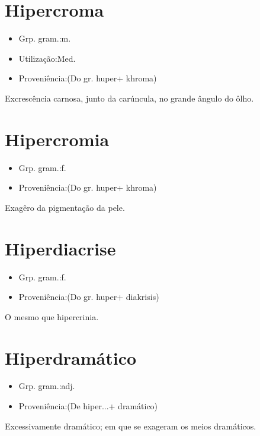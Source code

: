 \documentclass{article}
\begin{document}
\section{Hipercroma}
\begin{itemize}
\item {Grp. gram.:m.}
\end{itemize}
\begin{itemize}
\item {Utilização:Med.}
\end{itemize}
\begin{itemize}
\item {Proveniência:(Do gr. \textunderscore huper\textunderscore  + \textunderscore khroma\textunderscore )}
\end{itemize}
Excrescência carnosa, junto da carúncula, no grande ângulo do ôlho.
\section{Hipercromia}
\begin{itemize}
\item {Grp. gram.:f.}
\end{itemize}
\begin{itemize}
\item {Proveniência:(Do gr. \textunderscore huper\textunderscore  + \textunderscore khroma\textunderscore )}
\end{itemize}
Exagêro da pigmentação da pele.
\section{Hiperdiacrise}
\begin{itemize}
\item {Grp. gram.:f.}
\end{itemize}
\begin{itemize}
\item {Proveniência:(Do gr. \textunderscore huper\textunderscore  + \textunderscore diakrisis\textunderscore )}
\end{itemize}
O mesmo que \textunderscore hipercrinia\textunderscore .
\section{Hiperdramático}
\begin{itemize}
\item {Grp. gram.:adj.}
\end{itemize}
\begin{itemize}
\item {Proveniência:(De \textunderscore hiper...\textunderscore  + \textunderscore dramático\textunderscore )}
\end{itemize}
Excessivamente dramático; em que se exageram os meios dramáticos.
\end{document}
